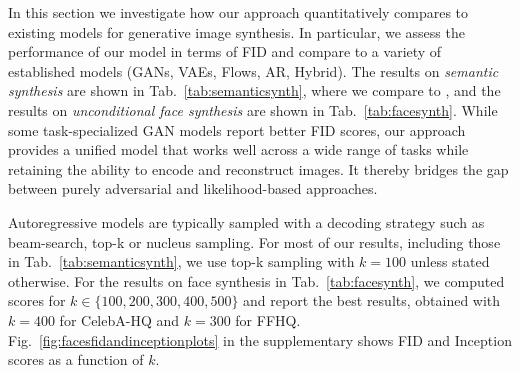  In this section we investigate how our approach quantitatively compares to existing models for generative image synthesis. In particular, we assess the performance of our model in terms of FID and compare to a variety of established models (GANs, VAEs, Flows, AR, Hybrid). The results on \emph{semantic synthesis} are shown in Tab.~\ref{tab:semanticsynth}, where we compare to
\cite{park2019semantic, wang2018pix2pixHD, katiyar2021improving, ChenK17}, and the results on \emph{unconditional face synthesis} are shown in
Tab.~\ref{tab:facesynth}.
While some task-specialized GAN models report better FID scores, our approach provides a unified model that works well across a wide range of tasks while retaining the ability to encode and reconstruct images. It thereby bridges the gap between purely adversarial and likelihood-based approaches.

 Autoregressive models are typically sampled with a decoding strategy \cite{DBLP:conf/iclr/HoltzmanBDFC20} such as beam-search, top-k or nucleus sampling. For most of our results, including those in Tab.~\ref{tab:semanticsynth}, we use top-k sampling with $k=100$ unless stated otherwise. For the results on face synthesis in Tab.~\ref{tab:facesynth}, we computed scores for
$k\in\{100,200,300,400,500\}$ and report the best results, obtained with $k=400$ for CelebA-HQ and $k=300$ for FFHQ. Fig.~\ref{fig:facesfidandinceptionplots} in the supplementary shows FID and Inception scores as a function of $k$.

